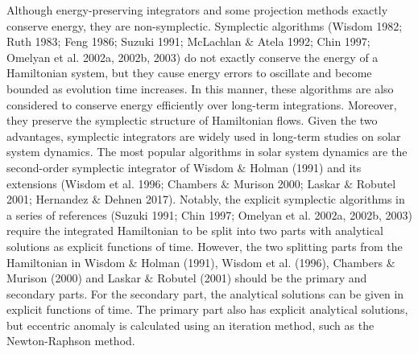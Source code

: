 \documentclass[preprint2]{aastex}
\begin{document}
Although energy-preserving integrators and some projection methods
exactly  conserve energy, they are non-symplectic. Symplectic
algorithms (Wisdom 1982; Ruth 1983; Feng 1986; Suzuki 1991;
McLachlan $\&$ Atela 1992; Chin 1997; Omelyan et al. 2002a, 2002b,
2003) do not exactly conserve the energy of a Hamiltonian system,
but they cause energy errors to oscillate and become bounded as
evolution time increases. In this manner, these algorithms are
also considered to conserve energy efficiently over long-term
integrations. Moreover, they preserve the symplectic structure of
Hamiltonian flows. Given the two advantages, symplectic
integrators are widely used in long-term studies on solar system
dynamics. The most popular algorithms in solar system dynamics are
the second-order symplectic integrator of Wisdom $\&$ Holman
(1991) and its extensions (Wisdom et al. 1996; Chambers $\&$
Murison 2000; Laskar $\&$ Robutel 2001; Hernandez $\&$ Dehnen
2017). Notably, the explicit symplectic algorithms in a series of
references (Suzuki 1991; Chin 1997; Omelyan et al. 2002a, 2002b,
2003) require the integrated Hamiltonian to be split into two
parts with analytical solutions as explicit functions of time.
However, the two splitting parts from the Hamiltonian in Wisdom
$\&$ Holman (1991), Wisdom et al. (1996), Chambers $\&$ Murison
(2000) and Laskar $\&$ Robutel (2001) should be the primary and
secondary parts. For the secondary part, the analytical solutions
can be given in explicit functions of time. The primary part also
has explicit analytical solutions, but eccentric anomaly is
calculated using an iteration method, such as the Newton-Raphson
method.
\end{document}
